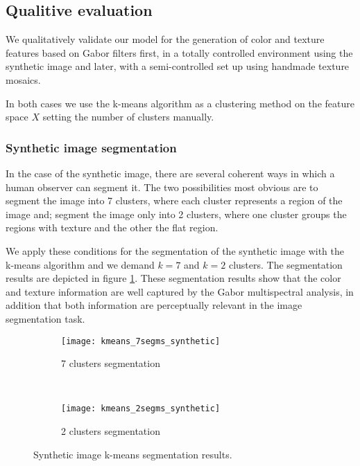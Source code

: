 \subsection{Qualitive evaluation}
We qualitatively validate our model for the generation of color and texture features based on Gabor filters first, in a totally controlled environment using the synthetic image and later, with a semi-controlled set up using handmade texture mosaics.

In both cases we use the k-means algorithm as a clustering method on the feature space $X$ setting the number of clusters manually.

\subsubsection{Synthetic image segmentation}
In the case of the synthetic image, there are several coherent ways in which a human observer can segment it. The two possibilities most obvious are to segment the image into 7 clusters, where each cluster represents a region of the image and; segment the image only into 2 clusters, where one cluster groups the regions with texture and the other the flat region. 

We apply these conditions for the segmentation of the synthetic image with the k-means algorithm and we demand $k = 7$ and $k = 2$ clusters. The segmentation results are depicted in figure \ref{fig:kmeans_segms_synthetic_img}. These segmentation results show that the color and texture information are well captured by the Gabor multispectral analysis, in addition that both information are perceptually relevant in the image segmentation task.  

\begin{figure}[!ht]
    \centering
    \begin{subfigure}[b]{\textwidth}
        \texttt{[image: kmeans\_7segms\_synthetic]}
        \caption{7 clusters segmentation}
    \end{subfigure} \\    
    \begin{subfigure}[b]{\textwidth}
    	\texttt{[image: kmeans\_2segms\_synthetic]}
        \caption{2 clusters segmentation}
    \end{subfigure} 
        	    
    \caption{Synthetic image k-means segmentation results.}\label{fig:kmeans_segms_synthetic_img}    
\end{figure}

